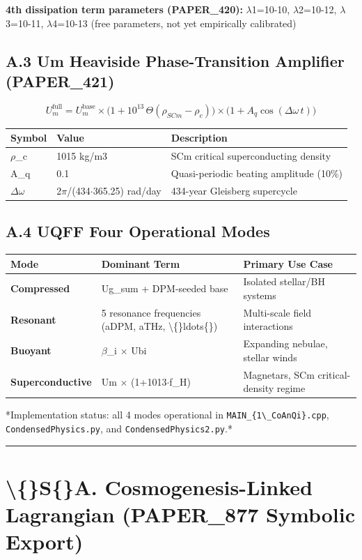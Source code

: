 \documentclass[11pt]{article}
\begin{document}
\textbf{4th dissipation term parameters (PAPER\_420):} $\lambda$1=10-10, $\lambda$2=10-12, $\lambda$3=10-11, $\lambda$4=10-13 (free parameters, not yet empirically calibrated)

\subsection*{A.3 Um Heaviside Phase-Transition Amplifier (PAPER\_421)}

$$U_m^{\mathrm{full}} = U_m^{\mathrm{base}} \times \bigl(1 + 10^{13}\,\Theta(\rho_{SCm} - \rho_c)\bigr) \times \bigl(1 + A_q\cos(\Delta\omega\,t)\bigr)$$

\begin{center}
\begin{longtable}{lll}
\toprule
Symbol & Value & Description \tabularnewline
\midrule
\endhead
$\rho$\_c & 1015 kg/m3 & SCm critical superconducting density \tabularnewline
A\_q & 0.1 & Quasi-periodic beating amplitude (10\%) \tabularnewline
$\Delta$$\omega$ & 2$\pi$/(434$\cdot$365.25) rad/day & 434-year Gleisberg supercycle \tabularnewline
\bottomrule
\end{longtable}
\end{center}

\subsection*{A.4 UQFF Four Operational Modes}

\begin{center}
\begin{longtable}{lll}
\toprule
Mode & Dominant Term & Primary Use Case \tabularnewline
\midrule
\endhead
\textbf{Compressed} & Ug\_sum + DPM-seeded base & Isolated stellar/BH systems \tabularnewline
\textbf{Resonant} & 5 resonance frequencies (aDPM, aTHz, \textbackslash\{\}ldots\{\}) & Multi-scale field interactions \tabularnewline
\textbf{Buoyant} & $\beta$\_i $\times$ Ubi & Expanding nebulae, stellar winds \tabularnewline
\textbf{Superconductive} & Um $\times$ (1+1013$\cdot$f\_H) & Magnetars, SCm critical-density regime \tabularnewline
\bottomrule
\end{longtable}
\end{center}

*Implementation status: all 4 modes operational in \verb|MAIN_{1\_CoAnQi}.cpp|, \verb|CondensedPhysics.py|, and \verb|CondensedPhysics2.py|.*

\noindent\rule{\textwidth}{0.4pt}

\section*{\textbackslash\{\}S\{\}A. Cosmogenesis-Linked Lagrangian (PAPER\_877 Symbolic Export)}
\end{document}
